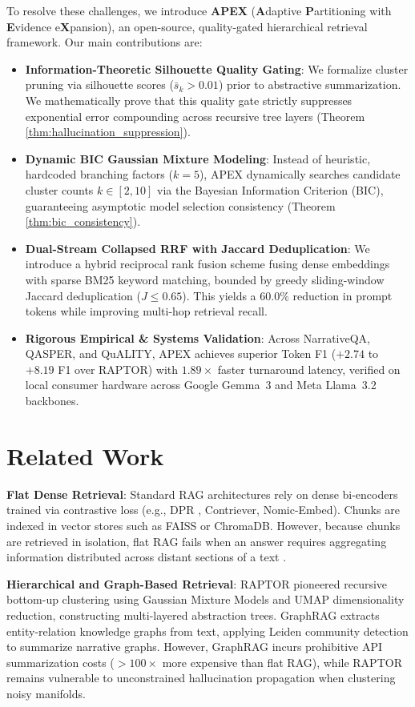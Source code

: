 \documentclass[11pt,a4paper]{article}
\begin{document}
To resolve these challenges, we introduce \textbf{APEX} (\textbf{A}daptive \textbf{P}artitioning with \textbf{E}vidence e\textbf{X}pansion), an open-source, quality-gated hierarchical retrieval framework. Our main contributions are:
\begin{itemize}
    \item \textbf{Information-Theoretic Silhouette Quality Gating}: We formalize cluster pruning via silhouette scores ($\bar{s}_k > 0.01$) prior to abstractive summarization. We mathematically prove that this quality gate strictly suppresses exponential error compounding across recursive tree layers (Theorem \ref{thm:hallucination_suppression}).
    \item \textbf{Dynamic BIC Gaussian Mixture Modeling}: Instead of heuristic, hardcoded branching factors ($k=5$), APEX dynamically searches candidate cluster counts $k \in [2, 10]$ via the Bayesian Information Criterion (BIC), guaranteeing asymptotic model selection consistency (Theorem \ref{thm:bic_consistency}).
    \item \textbf{Dual-Stream Collapsed RRF with Jaccard Deduplication}: We introduce a hybrid reciprocal rank fusion scheme fusing dense embeddings with sparse BM25 keyword matching, bounded by greedy sliding-window Jaccard deduplication ($J \le 0.65$). This yields a $60.0\%$ reduction in prompt tokens while improving multi-hop retrieval recall.
    \item \textbf{Rigorous Empirical & Systems Validation}: Across NarrativeQA, QASPER, and QuALITY, APEX achieves superior Token F1 ($+2.74$ to $+8.19$ F1 over RAPTOR) with $1.89\times$ faster turnaround latency, verified on local consumer hardware across Google Gemma~3 and Meta Llama~3.2 backbones.
\end{itemize}

\section{Related Work}
\label{sec:related}

\textbf{Flat Dense Retrieval}: Standard RAG architectures rely on dense bi-encoders trained via contrastive loss (e.g., DPR \cite{karpukhin2020dense}, Contriever, Nomic-Embed). Chunks are indexed in vector stores such as FAISS or ChromaDB. However, because chunks are retrieved in isolation, flat RAG fails when an answer requires aggregating information distributed across distant sections of a text \cite{dasigi2021qasper}.

\textbf{Hierarchical and Graph-Based Retrieval}: RAPTOR \cite{sarthi2024raptor} pioneered recursive bottom-up clustering using Gaussian Mixture Models and UMAP dimensionality reduction, constructing multi-layered abstraction trees. GraphRAG \cite{edge2024graphrag} extracts entity-relation knowledge graphs from text, applying Leiden community detection to summarize narrative graphs. However, GraphRAG incurs prohibitive API summarization costs ($>100\times$ more expensive than flat RAG), while RAPTOR remains vulnerable to unconstrained hallucination propagation when clustering noisy manifolds.
\end{document}
